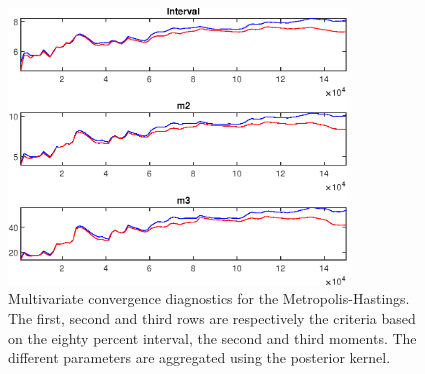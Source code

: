  
\begin{figure}[H]
\centering 
\includegraphics[width=0.8\textwidth]{BRS_gen/Output/BRS_gen_mdiag}
\caption{Multivariate convergence diagnostics for the Metropolis-Hastings.
The first, second and third rows are respectively the criteria based on
the eighty percent interval, the second and third moments. The different 
parameters are aggregated using the posterior kernel.}\label{Fig:MultivariateDiagnostics}
\end{figure}

